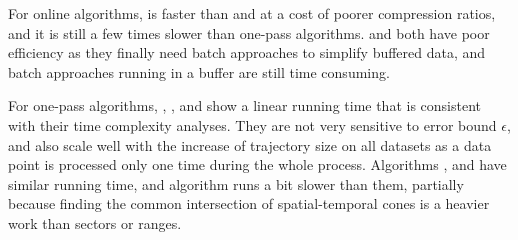 For online algorithms, \squishe is faster than \bqsa and \opwa at a cost of poorer compression ratios, and it is still a few times slower than one-pass algorithms. \bqsa and \opwa both have poor efficiency as they finally need batch approaches to simplify buffered data, and batch approaches running in a buffer are still time consuming.

For one-pass algorithms, \operb, \siped, \cised and \interval show a linear running time that is consistent with their time complexity analyses. They are not very sensitive to error bound $\epsilon$, and also scale well with the increase of trajectory size on all datasets as a data point is processed only one time during the whole process.
Algorithms \siped, \operb and \interval have similar running time, and algorithm \cised runs a bit slower than them, partially because finding the common intersection of spatial-temporal cones is a heavier work than sectors or ranges.


